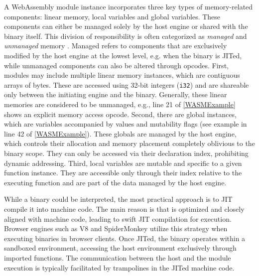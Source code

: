  A WebAssembly module instance incorporates three key types of memory-related components: linear memory, local variables and global variables. 
These components can either be managed solely by the host engine or shared with the \Wasm binary itself. 
This division of responsibility is often categorized as \emph{managed} and \emph{unmanaged} memory \cite{usenixWasm2020}. 
Managed refers to components that are exclusively modified by the host engine at the lowest level, e.g. when the \Wasm binary is JITed, while unmanaged components can also be altered through  \Wasm opcodes.
First, modules may include multiple linear memory instances, which are contiguous arrays of bytes. 
These are accessed using 32-bit integers (\texttt{i32}) and are shareable only between the initiating engine and the \Wasm binary. 
Generally, these linear memories are considered to be unmanaged, e.g., line 21 of \autoref{WASMExample} shows an explicit memory access opcode. 
Second, there are global instances, which are variables accompanied by values and mutability flags (see example in line 42 of \autoref{WASMExample}). 
These globals are managed by the host engine, which controls their allocation and memory placement completely oblivious to the \Wasm binary scope. 
They can only be accessed via their declaration index, prohibiting dynamic addressing. 
Third, local variables are mutable and specific to a given function instance. 
They are accessible only through their index relative to the executing function and are part of the data managed by the host engine.


While a \Wasm binary could be interpreted, the most practical approach is to JIT compile it into machine code.
The main reason is that \Wasm is optimized and closely aligned with machine code, leading to swift JIT compilation for execution.
Browser engines such as V8 and SpiderMonkey utilize this strategy when executing \Wasm binaries in browser clients.
Once JITed, the \Wasm binary operates within a sandboxed environment, accessing the host environment exclusively through imported functions.
The communication between the host and the \Wasm module execution is typically facilitated by trampolines in the JITed machine code.

